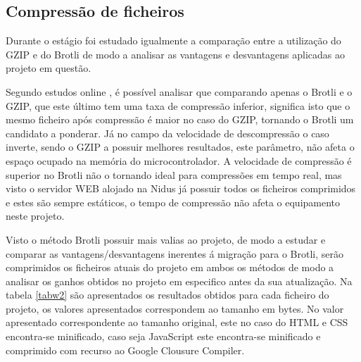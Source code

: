 \subsection{Compressão de ficheiros}

\par Durante o estágio foi estudado igualmente a comparação entre a utilização do GZIP e do Brotli de modo a analisar as vantagens e desvantagens aplicadas ao projeto em questão.
\par Segundo estudos online \cite{brotlivsgzip}, é possível analisar que comparando apenas o Brotli e o GZIP, que este último tem uma taxa de compressão inferior, significa isto que o mesmo ficheiro após compressão é maior no caso do GZIP, tornando o Brotli um candidato a ponderar. Já no campo da velocidade de descompressão o caso inverte, sendo o GZIP a possuir melhores resultados, este parâmetro, não afeta o espaço ocupado na memória do microcontrolador. A velocidade de compressão é superior no Brotli não o tornando ideal para compressões em tempo real, mas visto o servidor WEB alojado na Nidus já possuir todos os ficheiros comprimidos e estes são sempre estáticos, o tempo de compressão não afeta o equipamento neste projeto. 
\par Visto o método Brotli possuir mais valias ao projeto, de modo a estudar e comparar as vantagens/desvantagens inerentes á migração para o Brotli, serão comprimidos os ficheiros atuais do projeto em ambos os métodos de modo a analisar os ganhos obtidos no projeto em especifico antes da sua atualização. Na tabela \ref{tabw2} são apresentados os resultados obtidos para cada ficheiro do projeto, os valores apresentados correspondem ao tamanho em bytes. No valor apresentado correspondente ao tamanho original, este no caso do HTML e CSS encontra-se minificado, caso seja JavaScript este encontra-se minificado e comprimido com recurso ao Google Clousure Compiler.


